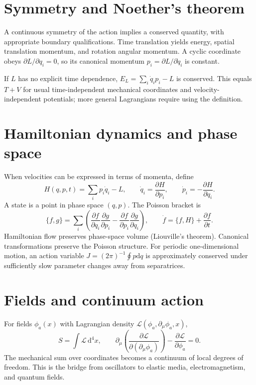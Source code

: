 \documentclass[11pt,oneside]{book}
\newcommand{\dd}{\mathrm{d}}
\newcommand{\pd}[2]{\frac{\partial #1}{\partial #2}}
\theoremstyle{reviewstyle}
\begin{document}
\section{Symmetry and Noether's theorem}
A continuous symmetry of the action implies a conserved quantity, with appropriate boundary qualifications. Time translation yields energy, spatial translation momentum, and rotation angular momentum. A cyclic coordinate obeys $\partial L/\partial q_i=0$, so its canonical momentum
$p_i=\partial L/\partial\dot q_i$ is constant.

If $L$ has no explicit time dependence, $E_L=\sum_i\dot q_ip_i-L$ is conserved. This equals $T+V$ for usual time-independent mechanical coordinates and velocity-independent potentials; more general Lagrangians require using the definition.
\section{Hamiltonian dynamics and phase space}
When velocities can be expressed in terms of momenta, define
\begin{equation}
H(q,p,t)=\sum_i p_i\dot q_i-L,
\qquad \dot q_i=\pd{H}{p_i},\qquad \dot p_i=-\pd{H}{q_i}.
\end{equation}
A state is a point in phase space $(q,p)$. The Poisson bracket is
\begin{equation}
\{f,g\}=\sum_i\left(\pd{f}{q_i}\pd{g}{p_i}-\pd{f}{p_i}\pd{g}{q_i}\right),\qquad
\dot f=\{f,H\}+\pd{f}{t}.
\end{equation}
Hamiltonian flow preserves phase-space volume (Liouville's theorem). Canonical transformations preserve the Poisson structure. For periodic one-dimensional motion, an action variable $J=(2\pi)^{-1}\oint p\dd q$ is approximately conserved under sufficiently slow parameter changes away from separatrices.
\section{Fields and continuum action}
For fields $\phi_a(x)$ with Lagrangian density $\mathcal L(\phi_a,\partial_\mu\phi_a,x)$,
\begin{equation}
S=\int\mathcal L\,\dd^4x,\qquad
\partial_\mu\left(\pd{\mathcal L}{(\partial_\mu\phi_a)}\right)-\pd{\mathcal L}{\phi_a}=0.
\end{equation}
The mechanical sum over coordinates becomes a continuum of local degrees of freedom. This is the bridge from oscillators to elastic media, electromagnetism, and quantum fields.
\end{document}
